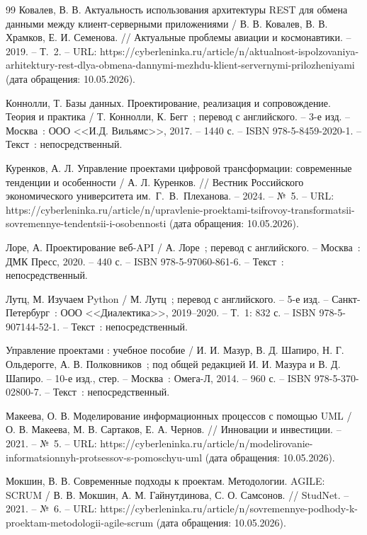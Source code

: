 \begin{thebibliography}{99}
	 Ковалев, В. В. Актуальность использования архитектуры REST для обмена данными между клиент-серверными приложениями / В. В. Ковалев, В. В. Храмков, Е. И. Семенова. // Актуальные проблемы авиации и космонавтики. -- 2019. -- Т.~2. -- URL: https://cyberleninka.ru/article/n/aktualnost-ispolzovaniya-arhitektury-rest-dlya-obmena-dannymi-mezhdu-klient-servernymi-prilozheniyami (дата обращения: 10.05.2026).

	 Коннолли, Т. Базы данных. Проектирование, реализация и сопровождение. Теория и практика / Т. Коннолли, К. Бегг~; перевод с английского. -- 3-е изд. -- Москва~: ООО <<И.Д. Вильямс>>, 2017. -- 1440 с. -- ISBN 978-5-8459-2020-1. -- Текст~: непосредственный.

	 Куренков, А. Л. Управление проектами цифровой трансформации: современные тенденции и особенности / А. Л. Куренков. // Вестник Российского экономического университета им.~Г.~В.~Плеханова. -- 2024. -- №~5. -- URL: https://cyberleninka.ru/article/n/upravlenie-proektami-tsifrovoy-transformatsii-sovremennye-tendentsii-i-osobennosti (дата обращения: 10.05.2026).

	 Лоре, А. Проектирование веб-API / А. Лоре~; перевод с английского. -- Москва~: ДМК Пресс, 2020. -- 440 с. -- ISBN 978-5-97060-861-6. -- Текст~: непосредственный.

	 Лутц, М. Изучаем Python / М. Лутц~; перевод с английского. -- 5-е изд. -- Санкт-Петербург~: ООО <<Диалектика>>, 2019--2020. -- Т.~1: 832 с. -- ISBN 978-5-907144-52-1. -- Текст~: непосредственный.

	 Управление проектами : учебное пособие / И. И. Мазур, В. Д. Шапиро, Н. Г. Ольдерогге, А. В. Полковников~; под общей редакцией И. И. Мазура и В. Д. Шапиро. -- 10-е изд., стер. -- Москва~: Омега-Л, 2014. -- 960 с. -- ISBN 978-5-370-02800-7. -- Текст~: непосредственный.

	 Макеева, О. В. Моделирование информационных процессов с помощью UML / О. В. Макеева, М. В. Сартаков, Е. А. Чернов. // Инновации и инвестиции. -- 2021. -- №~5. -- URL: https://cyberleninka.ru/article/n/modelirovanie-informatsionnyh-protsessov-s-pomoschyu-uml (дата обращения: 10.05.2026).

	 Мокшин, В. В. Современные подходы к проектам. Методологии. AGILE: SCRUM / В. В. Мокшин, А. М. Гайнутдинова, С. О. Самсонов. // StudNet. -- 2021. -- №~6. -- URL: https://cyberleninka.ru/article/n/sovremennye-podhody-k-proektam-metodologii-agile-scrum (дата обращения: 10.05.2026).


\end{thebibliography}
